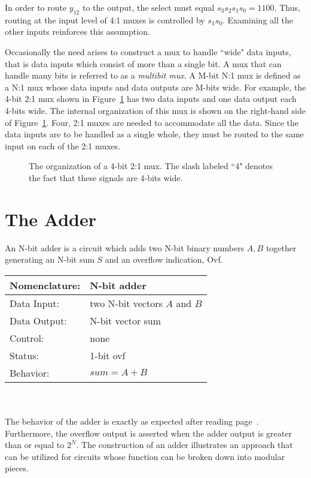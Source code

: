 In order to route $y_{12}$ to the output, the select must equal
$s_3 s_2 s_1 s_0 = 1100$.  Thus, routing at the input level of 4:1 
muxes is controlled by $s_1 s_0$.  Examining all the other 
inputs reinforces this assumption.

Occasionally the need arises to construct a mux to handle
``wide" data inputs, that is data inputs which consist of more than
a single bit.  A mux that can handle many bits is referred to 
as a \textit{ multibit mux}.  \label{multibit mux} A M-bit N:1 mux is 
defined as a N:1 mux whose data inputs and data outputs are M-bits
wide.  For example, the 4-bit 2:1 mux shown in Figure~\ref{fig:comboBB4x2x1mux} 
has two data inputs and one data output each 4-bits wide.  The internal
organization of this mux is shown on the right-hand side of 
Figure~\ref{fig:comboBB4x2x1mux}.  Four, 2:1 muxes are needed to 
accommodate all the data.  Since the data inputs are to 
be handled as a single whole, they must be routed to the
same input on each of the 2:1 muxes.
\label{page:wmu}

\begin{figure}[ht]
\caption{The organization of a 4-bit 2:1 mux.  The slash labeled ``4" 
denotes the fact that these signals are 4-bits wide.}
\label{fig:comboBB4x2x1mux}
\end{figure}


\section{The Adder}
An N-bit adder is a circuit which adds two N-bit binary numbers 
$A,B$ together generating an N-bit sum $S$ and an overflow 
indication, Ovf.   

\begin{tabular}{|l|p{3.5in}|} \hline                    
Nomenclature:  & N-bit adder				\\ \hline
Data Input:    & two N-bit vectors $A$ and $B$		\\ \hline
Data Output:   & N-bit vector sum			\\ \hline
Control:       & none					\\ \hline
Status:        & 1-bit ovf 				\\ \hline
Behavior:      & $sum = A+B$				\\ \hline
\end{tabular}
\\ \\
The behavior of the adder is exactly as expected after reading
page~\pageref{page:addition}.  Furthermore, the overflow output is asserted 
when the adder output is greater than or equal to $2^N$.  The construction 
of an adder illustrates an approach that can be utilized for circuits 
whose function can be broken down into modular pieces. 

